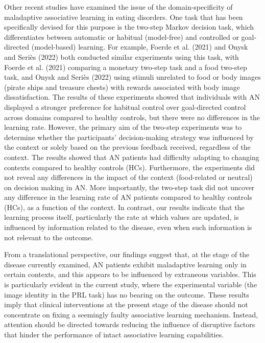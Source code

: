 \documentclass[
  man,floatsintext]{apa6}
\begin{document}
Other recent studies have examined the issue of the domain-specificity of maladaptive associative learning in eating disorders. One task that has been specifically devised for this purpose is the two-step Markov decision task, which differentiates between automatic or habitual (model-free) and controlled or goal-directed (model-based) learning. For example, Foerde et al. (2021) and Onysk and Seriès (2022) both conducted similar experiments using this task, with Foerde et al. (2021) comparing a monetary two-step task and a food two-step task, and Onysk and Seriès (2022) using stimuli unrelated to food or body images (pirate ships and treasure chests) with rewards associated with body image dissatisfaction. The results of these experiments showed that individuals with AN displayed a stronger preference for habitual control over goal-directed control across domains compared to healthy controls, but there were no differences in the learning rate. However, the primary aim of the two-step experiments was to determine whether the participants' decision-making strategy was influenced by the context or solely based on the previous feedback received, regardless of the context. The results showed that AN patients had difficulty adapting to changing contexts compared to healthy controls (HCs). Furthermore, the experiments did not reveal any differences in the impact of the context (food-related or neutral) on decision making in AN. More importantly, the two-step task did not uncover any difference in the learning rate of AN patients compared to healthy controls (HCs), as a function of the context. In contrast, our results indicate that the learning process itself, particularly the rate at which values are updated, is influenced by information related to the disease, even when such information is not relevant to the outcome.

From a translational perspective, our findings suggest that, at the stage of the disease currently examined, AN patients exhibit maladaptive learning only in certain contexts, and this appears to be influenced by extraneous variables. This is particularly evident in the current study, where the experimental variable (the image identity in the PRL task) has no bearing on the outcome. These results imply that clinical interventions at the present stage of the disease should not concentrate on fixing a seemingly faulty associative learning mechanism. Instead, attention should be directed towards reducing the influence of disruptive factors that hinder the performance of intact associative learning capabilities.
\end{document}
